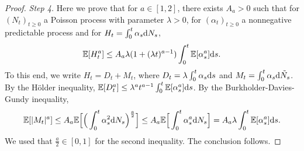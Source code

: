 \documentclass[11pt]{article}
\newcommand{\E}{\mathbb{E}}
\newcommand{\1}{\mathbbm{1}}
\newcommand{\dd}{{\rm d}}
\newcommand{\vip}{\vskip5pt}
\begin{document}
\begin{proof}
{\it Step 4.} Here we prove that for $a\in [1,2]$, there exists $A_a>0$ such that for $(N_t)_{t\geq 0}$ 
a Poisson process with parameter $\lambda>0$, for 
$(\alpha_t)_{t\geq 0}$ a nonnegative predictable process and for $H_t=\int_0^t \alpha_s\dd N_s$,
$$
\E[H_t^a]\leq A_a \lambda (1+(\lambda t)^{a-1})\int_0^t \E[\alpha_s^a]\dd s.
$$
To this end, we write $H_t=D_t+M_t$, where $D_t=\lambda\int_0^t \alpha_s \dd s$
and $M_t=\int_0^t \alpha_s \dd \tilde N_s$. By the Hölder inequality, 
$\E[D_t^a]\leq \lambda^a t^{a-1} \int_0^t \E[\alpha_s^a] \dd s$. By the Burkholder-Davies-Gundy inequality,
$$
\E[|M_t|^a]\leq A_a \E\Big[\Big(\int_0^t \alpha_s^2 \dd N_s\Big)^{\frac a2}\Big]
\leq A_a \E\Big[\int_0^t \alpha_s^a \dd N_s\Big]=A_a \lambda \int_0^t \E[\alpha_s^a] \dd s.
$$
We used that $\frac a2 \in [0,1]$ for the second inequality. The conclusion follows.

\vip


\end{proof}
\end{document}
